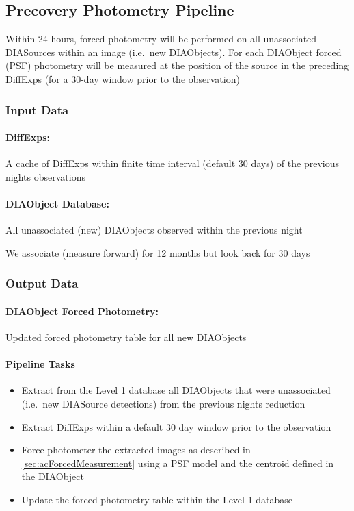 \clearpage

\subsection{Precovery Photometry Pipeline}

Within 24 hours, forced photometry will be performed on all unassociated DIASources within an image (i.e.\ new DIAObjects). For each DIAObject forced (PSF) photometry will be measured at the position of the source in the preceding DiffExps (for a 30-day window prior to the observation)

\subsubsection{Input Data}

\paragraph*{DiffExps:} A cache of DiffExps within finite time interval (default 30 days)  of the previous nights observations

\paragraph*{DIAObject Database:} All unassociated (new) DIAObjects observed within the previous night

\begin{note} We associate (measure forward) for 12 months but look back for 30 days\end{note}

\subsubsection{Output Data}

\paragraph*{DIAObject Forced Photometry:} Updated forced photometry table for all new DIAObjects


\paragraph{Pipeline Tasks}
\begin{itemize}
\item Extract from the Level 1 database all DIAObjects that were unassociated (i.e.\ new DIASource detections) from the previous nights reduction
\item Extract DiffExps within a  default 30 day window prior to the observation
\item Force photometer the extracted images as described in \ref{sec:acForcedMeasurement} using a PSF model and the centroid defined in the DIAObject
\item Update the forced photometry table within the Level 1 database
\end{itemize}
\clearpage



